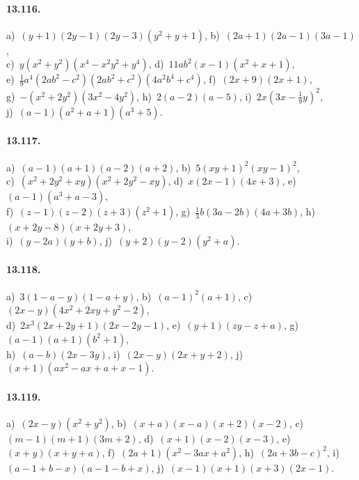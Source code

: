 \paragraph{13.116.}
a)~$(y+1)(2y-1)(2y-3)\left(y^{2}+y+1\right)$,\quad 
b)~$(2a+1)(2a-1)(3a-1)$,\protect\\
c)~$y\left(x^{2}+y^{2}\right)\left(x^{4}-x^{2}y^{2}+y^{4}\right)$,\quad 
d)~$11ab^{2}(x-1)\left(x^{2}+x+1\right)$,\protect\\
e)~$\frac{1}{9}a^{4}\left(2ab^{2}-c^{2}\right)\left(2ab^{2}+c^{2}\right)\left(4a^{2}b^{4}+c^{4}\right)$,\quad 
f)~$(2x+9)(2x+1)$,\protect\\
g)~$-\left(x^{2}+2y^{2}\right)\left(3x^{2}-4y^{2}\right)$,\quad 
h)~$2(a-2)(a-5)$,\quad 
i)~$2x\left(3x-\frac{1}{9}y\right)^{2}$,\protect\\
j)~$(a-1)\left(a^{2}+a+1\right)\left(a^{3}+5\right)$.

\paragraph{13.117.}
a)~$(a-1)(a+1)(a-2)(a+2)$,\quad 
b)~$5(xy+1)^{2}(xy-1)^{2}$,\protect\\ 
c)~$\left(x^{2}+2y^{2}+xy\right)\left(x^{2}+2y^{2}-xy\right)$,\quad 
d)~$x(2x-1)(4x+3)$,\quad 
e)~$(a-1)\left(a^{3}+a-3\right)$,\protect\\
f)~$(z-1)(z-2)(z+3)\left(z^{2}+1\right)$,\quad 
g)~$\frac{1}{3}b(3a-2b)(4a+3b)$,\quad 
h)~$(x+2y-8)(x+2y+3)$,\protect\\
i)~$(y-2a)(y+b)$,\quad 
j)~$(y+2)(y-2)\left(y^{2}+a\right)$.

\paragraph{13.118.}
a)~$3(1-a-y)(1-a+y)$,\quad 
b)~$(a-1)^{2}(a+1)$,\quad 
c)~$(2x-y)\left(4x^{2}+2xy+y^{2}-2\right)$,\protect\\
d)~$2x^{3}(2x+2y+1)(2x-2y-1)$,\quad 
e)~$(y+1)(zy-z+a)$,\quad 
g)~$(a-1)(a+1)\left(b^{2}+1\right)$,\protect\\
h)~$(a-b)(2x-3y)$,\quad
i)~$(2x-y)(2x+y+2)$,\quad 
j)~$(x+1)\left(ax^{2}-ax+a+x-1\right)$.

\paragraph{13.119.}
a)~$(2x-y)\left(x^{2}+y^{2}\right)$,\quad 
b)~$(x+a)(x-a)(x+2)(x-2)$,\quad 
c)~$(m-1)(m+1)(3m+2)$,\quad 
d)~$(x+1)(x-2)(x-3)$,\quad 
e)~$(x+y)(x+y+a)$,\quad 
f)~$(2a+1)\left(x^{2}-3ax+a^{2}\right)$,\quad 
h)~$(2a+3b-c)^{2}$,\quad 
i)~$(a-1+b-x)(a-1-b+x)$,\quad 
j)~$(x-1)(x+1)(x+3)(2x-1)$.

